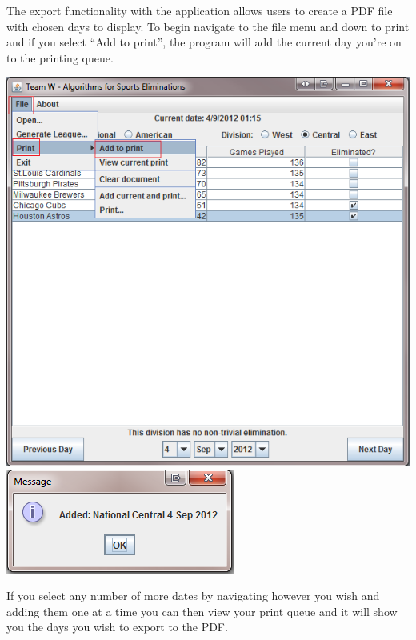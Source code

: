 The export functionality with the application allows users to create a PDF file
with chosen days to display. To begin navigate to the file menu and down to
print and if you select ``Add to print'', the program will add the current day
you're on to the printing queue.

\includegraphics[width=\linewidth,keepaspectratio]{images/userManualDesk9.png}
\includegraphics[width=\linewidth,keepaspectratio]{images/userManualDesk10.png}

If you select any number of more dates by navigating however you wish and adding
them one at a time you can then view your print queue and it will show you the
days you wish to export to the PDF.

